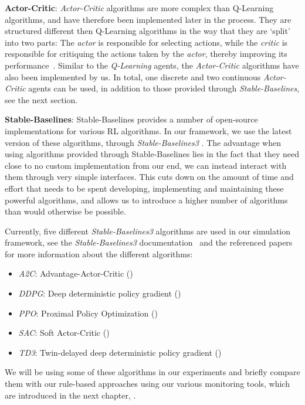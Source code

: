 \medskip
\noindent\textbf{Actor-Critic}:\label{item:ActorCritic} \emph{Actor-Critic} algorithms are more complex than Q-Learning algorithms, and have therefore been implemented later in the process. They are structured different then Q-Learning algorithms in the way that they are `split' into two parts: The \emph{actor} is responsible for selecting actions, while the \emph{critic} is responsible for critiquing  the actions taken by the \emph{actor}, thereby improving its performance~\cite{ActorCritic}. Similar to the \emph{Q-Learning} agents, the \emph{Actor-Critic} algorithms have also been implemented by us. In total, one discrete and two continuous \emph{Actor-Critic} agents can be used, in addition to those provided through \emph{Stable-Baselines}, see the next section.

\medskip
\noindent\textbf{Stable-Baselines}:\label{item:StableBaselines} Stable-Baselines provides a number of open-source implementations for various RL algorithms. In our framework, we use the latest version of these algorithms, through \emph{Stable-Baselines3} \cite{StableBaselines3}. The advantage when using algorithms provided through Stable-Baselines lies in the fact that they need close to no custom implementation from our end, we can instead interact with them through very simple interfaces. This cuts down on the amount of time and effort that needs to be spent developing, implementing and maintaining these powerful algorithms, and allows us to introduce a higher number of algorithms than would otherwise be possible.

\pagebreak
Currently, five different \emph{Stable-Baselines3} algorithms are used in our simulation framework, see the \emph{Stable-Baselines3} documentation~\cite{StableBaselines3Algorithms} and the referenced papers for more information about the different algorithms:
\begin{itemize}
	\item \emph{A2C}: Advantage-Actor-Critic (\cite{StableBaselines3A2C})
	\item \emph{DDPG}: Deep deterministic policy gradient (\cite{StableBaselines3DDPG})
	\item \emph{PPO}: Proximal Policy Optimization (\cite{StableBaselines3PPO})
	\item \emph{SAC}: Soft Actor-Critic (\cite{StableBaselines3SAC})
	\item \emph{TD3}: Twin-delayed deep deterministic policy gradient (\cite{StableBaselines3TD3})
\end{itemize}
We will be using some of these algorithms in our experiments and briefly compare them with our rule-based approaches using our various monitoring tools, which are introduced in the next chapter, .
